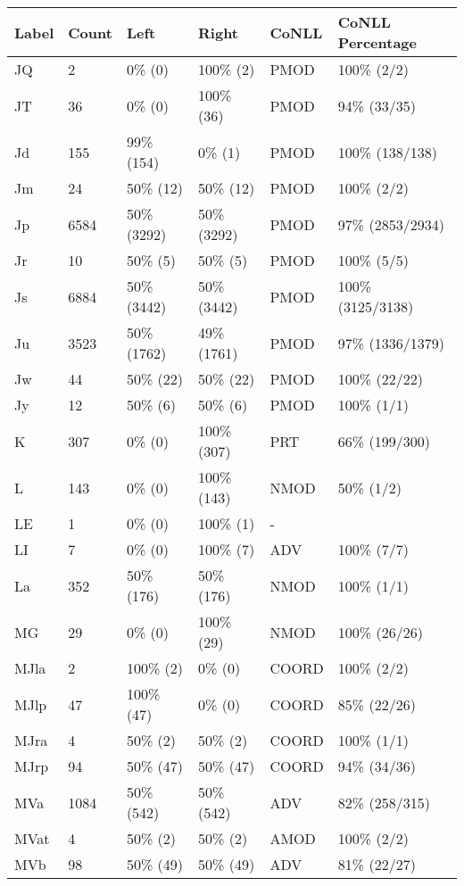 \begin{figure*}
\begin{tabular}{|l|l|l|l||l|l|}
\hline
Label & Count & Left & Right & CoNLL & CoNLL Percentage\\ 
\hline
 JQ & 2 & 0\% (0) & 100\% (2) & PMOD & 100\% (2/2) \\ 
\hline
 JT & 36 & 0\% (0) & 100\% (36) & PMOD & 94\% (33/35) \\ 
\hline
 Jd & 155 & 99\% (154) & 0\% (1) & PMOD & 100\% (138/138) \\ 
\hline
 Jm & 24 & 50\% (12) & 50\% (12) & PMOD & 100\% (2/2) \\ 
\hline
 Jp & 6584 & 50\% (3292) & 50\% (3292) & PMOD & 97\% (2853/2934) \\ 
\hline
 Jr & 10 & 50\% (5) & 50\% (5) & PMOD & 100\% (5/5) \\ 
\hline
 Js & 6884 & 50\% (3442) & 50\% (3442) & PMOD & 100\% (3125/3138) \\ 
\hline
 Ju & 3523 & 50\% (1762) & 49\% (1761) & PMOD & 97\% (1336/1379) \\ 
\hline
 Jw & 44 & 50\% (22) & 50\% (22) & PMOD & 100\% (22/22) \\ 
\hline
 Jy & 12 & 50\% (6) & 50\% (6) & PMOD & 100\% (1/1) \\ 
\hline
 K & 307 & 0\% (0) & 100\% (307) & PRT & 66\% (199/300) \\ 
\hline
 L & 143 & 0\% (0) & 100\% (143) & NMOD & 50\% (1/2) \\ 
\hline
 LE & 1 & 0\% (0) & 100\% (1) & - &  \\ 
\hline
 LI & 7 & 0\% (0) & 100\% (7) & ADV & 100\% (7/7) \\ 
\hline
 La & 352 & 50\% (176) & 50\% (176) & NMOD & 100\% (1/1) \\ 
\hline
 MG & 29 & 0\% (0) & 100\% (29) & NMOD & 100\% (26/26) \\ 
\hline
 MJla & 2 & 100\% (2) & 0\% (0) & COORD & 100\% (2/2) \\ 
\hline
 MJlp & 47 & 100\% (47) & 0\% (0) & COORD & 85\% (22/26) \\ 
\hline
 MJra & 4 & 50\% (2) & 50\% (2) & COORD & 100\% (1/1) \\ 
\hline
 MJrp & 94 & 50\% (47) & 50\% (47) & COORD & 94\% (34/36) \\ 
\hline
 MVa & 1084 & 50\% (542) & 50\% (542) & ADV & 82\% (258/315) \\ 
\hline
 MVat & 4 & 50\% (2) & 50\% (2) & AMOD & 100\% (2/2) \\ 
\hline
 MVb & 98 & 50\% (49) & 50\% (49) & ADV & 81\% (22/27) \\ 

\end{tabular}
\end{figure*}
